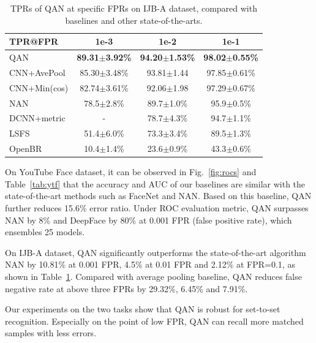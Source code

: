 \begin{table}[!htbp]
\footnotesize
  \centering
  \begin{tabular}{l|c|c|c}
    \hline
       TPR@FPR & 1e-3 & 1e-2  & 1e-1 \\
    \hline
       QAN 	& \bf{89.31$\pm$3.92\%} & \bf{94.20$\pm$1.53\%} & \bf{98.02$\pm$0.55\%} \\
       CNN+AvePool 		& 85.30$\pm$3.48\% & 93.81$\pm$1.44 & 97.85$\pm$0.61\% \\
       CNN+Min(cos) 	& 82.74$\pm$3.61\% & 92.06$\pm$1.98 & 97.29$\pm$0.67\% \\
    \hline
       NAN\cite{yang2016neural}		&78.5$\pm$2.8\% &89.7$\pm$1.0\% &95.9$\pm$0.5\% \\
       DCNN+metric\cite{chen2015end} 	& - & 78.7$\pm$4.3\% & 94.7$\pm$1.1\% \\
       LSFS\cite{wang2015face}				& 51.4$\pm$6.0\% & 73.3$\pm$3.4\% & 89.5$\pm$1.3\% \\
       OpenBR\cite{klontz2013open}				& 10.4$\pm$1.4\% & 23.6$\pm$0.9\% & 43.3$\pm$0.6\% \\
    \hline
  \end{tabular}
  \caption{TPRs of QAN at specific FPRs on IJB-A dataset, compared with baselines and other state-of-the-arts.}
  \label{tab:ijb}
\end{table}

On YouTube Face dataset, it can be observed in Fig.~\ref{fig:rocs} and Table~\ref{tab:ytf} that the accuracy and AUC of our baselines are similar with the state-of-the-art methods such as FaceNet and NAN. Based on this baseline, QAN further reduces 15.6\% error ratio. Under ROC evaluation metric, QAN surpasses NAN by 8\% and DeepFace by 80\% at 0.001 FPR (false positive rate), which ensembles 25 models.

On IJB-A dataset, QAN significantly outperforms the state-of-the-art algorithm NAN by 10.81\% at 0.001 FPR, 4.5\% at 0.01 FPR and 2.12\% at FPR=0.1, as shown in Table~\ref{tab:ijb}. Compared with average pooling baseline, QAN reduces false negative rate at above three FPRs by 29.32\%, 6.45\% and 7.91\%.

Our experiments on the two tasks show that QAN is robust for set-to-set recognition. Especially on the point of low FPR, QAN can recall more matched samples with less errors.



